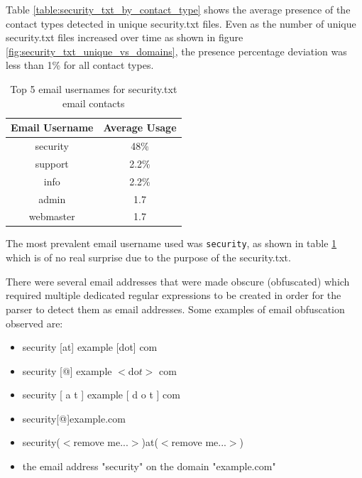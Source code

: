 \documentclass{mscreport}
\begin{document}
\noindent
Table \ref{table:security_txt_by_contact_type} shows the average presence of the contact types detected in unique security.txt files. Even as the number of unique security.txt files increased over time as shown in figure \ref{fig:security_txt_unique_vs_domains}, the presence percentage deviation was less than 1\% for all contact types.

\begin{table}[H]
  \begin{center}
    \begin{tabular}{|c|c|}  %
      \hline
      \textbf{Email Username} & \textbf{Average Usage}\\
      \hline
      security & 48\%\\
      \hline
      support & 2.2\%\\
      \hline
      info & 2.2\%\\
      \hline
      admin & 1.7\\
      \hline
      webmaster & 1.7\\
      \hline
    \end{tabular}
    \caption{Top 5 email usernames for security.txt email contacts}
    \label{table:security_txt_by_email_username} %
  \end{center}
\end{table}

\noindent
The most prevalent email username used was \texttt{security}, as shown in table \ref{table:security_txt_by_email_username} which is of no real surprise due to the purpose of the security.txt.

\vspace{0.3cm} \noindent
There were several email addresses that were made obscure (obfuscated) which required multiple dedicated regular expressions to be created in order for the parser to detect them as email addresses. Some examples of email obfuscation observed are:

\begin{itemize}
	\setlength\itemsep{0.01em}
    \item security [at] example [dot] com
    \item security [@] example $<$do$t>$ com
    \item security [ a t ] example [ d o t ] com
    \item security[@]example.com
    \item security($<$remove me...$>$)at($<$remove me...$>$)
    \item the email address "security" on the domain "example.com"
\end{itemize}
\end{document}
